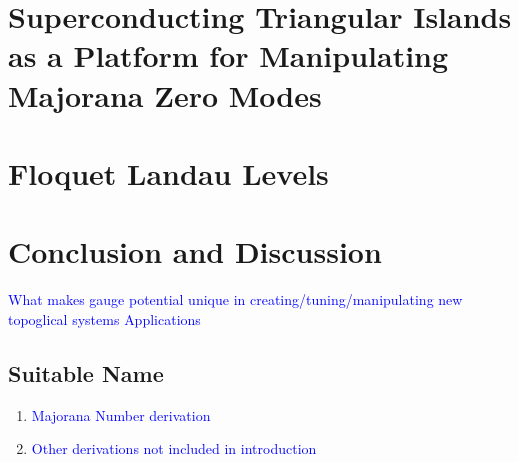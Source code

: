 \documentclass[12pt,doctor]{thesis}
\newcommand{\Blue}[1]{\textcolor{blue}{#1}}
\begin{document}
\chapter{Superconducting Triangular Islands as a Platform for Manipulating Majorana Zero Modes}







\chapter{Floquet Landau Levels}







\chapter{Conclusion and Discussion}

\Blue{What makes gauge potential unique in creating/tuning/manipulating new topoglical systems}
\Blue{Applications}

\begin{appendices}
\chapter{Suitable Name}
\begin{enumerate}
  \item \Blue{Majorana Number derivation}
  \item \Blue{Other derivations not included in introduction}
\end{enumerate}


\end{appendices}




\end{document}

